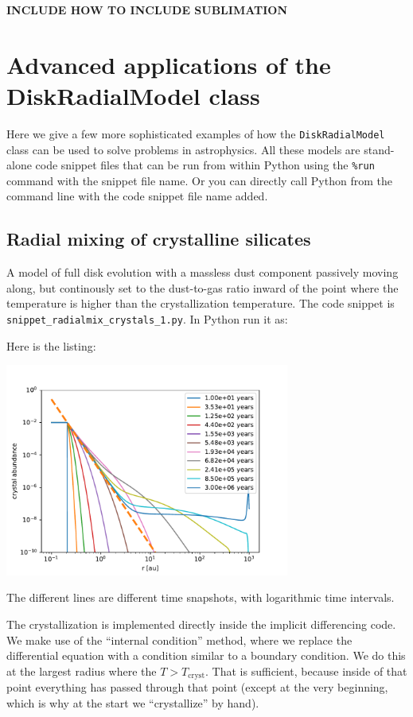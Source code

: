 \documentclass{book}
\newcommand{\code}[1]{{\small\tt #1}}
\begin{document}
{\bf INCLUDE HOW TO INCLUDE SUBLIMATION}




\chapter{Advanced applications of the DiskRadialModel class}
Here we give a few more sophisticated examples of how the \code{DiskRadialModel} class
can be used to solve problems in astrophysics. All these models are stand-alone
code snippet files that can be run from within Python using the \code{\%run}
command with the snippet file name. Or you can directly call Python from the
command line with the code snippet file name added.

\section{Radial mixing of crystalline silicates}
A model of full disk evolution with a massless dust component passively moving
along, but continously set to the dust-to-gas ratio inward of the point where the
temperature is higher than the crystallization temperature. The code snippet is
\code{snippet\_radialmix\_crystals\_1.py}. In Python run it as:
\begin{codebox}
\end{codebox}
Here is the listing:

\centerline{\includegraphics[width=0.7\textwidth]{../snippets/fig_snippet_radialmix_crystals_1_1.pdf}}
The different lines are different time snapshots, with logarithmic time intervals.

The crystallization is implemented directly inside the implicit differencing code.
We make use of the ``internal condition'' method, where we replace the differential
equation with a condition similar to a boundary condition. We do this at the largest
radius where the $T>T_{\mathrm{cryst}}$. That is sufficient, because inside of that point
everything has passed through that point (except at the very beginning, which is why
at the start we ``crystallize'' by hand).
\end{document}
